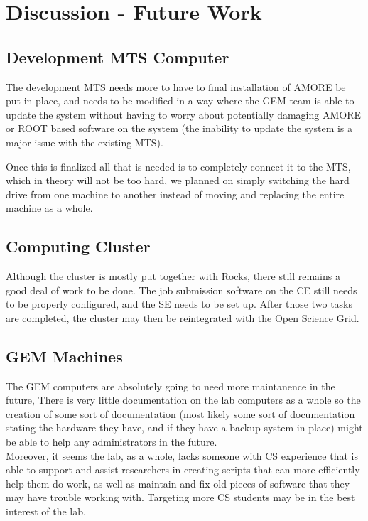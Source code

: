 \documentclass[12pt]{article}
\newcommand\tab[1][1cm]{\hspace*{#1}}
\begin{document}
\section{Discussion - Future Work}

\subsection{Development MTS Computer}

\tab The development MTS needs more to have to final installation of AMORE be put in place, and 
needs to be modified in a way where the GEM team is able to update the system without having to
worry about potentially damaging AMORE or ROOT based software on the system (the inability to
update the system is a major issue with the existing MTS). 

\tab Once this is finalized all that is needed is to completely connect it to the MTS, which 
in theory will not be too hard, we planned on simply switching the hard drive from one machine
to another instead of moving and replacing the entire machine as a whole. 

\subsection{Computing Cluster}

\tab Although the cluster is mostly put together with Rocks, there still remains
a good deal of work to be done. The job submission software on the CE still
needs to be properly configured, and the SE needs to be set up. After those two
tasks are completed, the cluster may then be reintegrated with the Open Science Grid.

\subsection{GEM Machines}

\tab The GEM computers are absolutely going to need more maintanence in the future, There is very
little documentation on the lab computers as a whole so the creation of some sort of documentation
(most likely some sort of documentation stating the hardware they have, and if they have a backup
system in place) might be able to help any administrators in the future. \\
\tab Moreover, it seems the lab, as a whole, lacks someone with CS experience that is able to
support and assist researchers in creating scripts that can more efficiently help them do work,
as well as maintain and fix old pieces of software that they may have trouble working with. Targeting more CS students may be in the best interest of the lab. 
\end{document}
